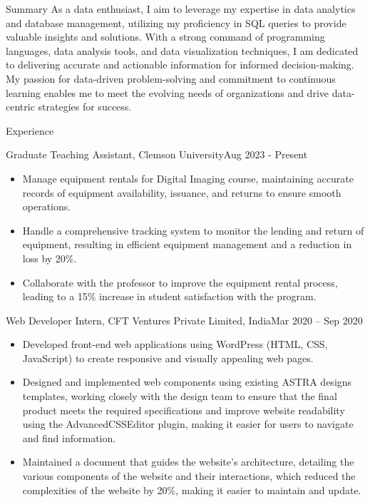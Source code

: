 \documentclass[]{mcdowellcv}
\begin{document}
	\makeheader

        \begin{cvsection}{Summary}\vspace{6pt}
            \setlength{\parindent}{0.5in}
                As a data enthusiast, I aim to leverage my expertise in data analytics and database management, utilizing my proficiency in SQL queries to provide valuable insights and solutions. With a strong command of programming languages, data analysis tools, and data visualization techniques, I am dedicated to delivering accurate and actionable information for informed decision-making. My passion for data-driven problem-solving and commitment to continuous learning enables me to meet the evolving needs of organizations and drive data-centric strategies for success.
        \end{cvsection}

        \begin{cvsection}{Experience}
            \begin{cvsubsection}{Graduate Teaching Assistant, Clemson University}{}{Aug 2023 - Present}
                \begin{itemize}
                    \item Manage equipment rentals for Digital Imaging course, maintaining accurate records of equipment availability, issuance, and returns to ensure smooth operations.
                    \item Handle a comprehensive tracking system to monitor the lending and return of equipment, resulting in efficient equipment management and a reduction in loss by 20\%.
                    \item Collaborate with the professor to improve the equipment rental process, leading to a 15\% increase in student satisfaction with the program.
                \end{itemize}
                
            \end{cvsubsection}
		\begin{cvsubsection}{Web Developer Intern, CFT Ventures Private Limited, India}{}{Mar 2020 -- Sep 2020} 
                \begin{itemize}
                        \item Developed front-end web applications using WordPress (HTML, CSS, JavaScript) to create responsive and visually appealing web pages.
                        \item Designed and implemented web components using existing ASTRA designs templates, working closely with the design team to ensure that the final product meets the required specifications and improve website readability using the AdvancedCSSEditor plugin, making it easier for users to navigate and find information.
                        \item Maintained a document that guides the website’s architecture, detailing the various components of the website and their interactions, which reduced the complexities of the website by 20\%, making it easier to maintain and update.
                    \end{itemize}
		\end{cvsubsection}
	\end{cvsection}
\end{document}
